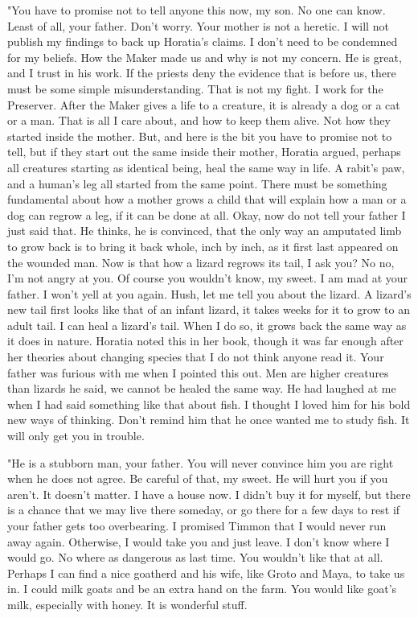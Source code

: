 \documentclass{article}
\begin{document}
"You have to promise not to tell anyone this now, my son. No one can know. Least of all, your father. Don't worry. Your mother is not a heretic. I will not publish my findings to back up Horatia's claims. I don't need to be condemned for my beliefs. How the Maker made us and why is not my concern. He is great, and I trust in his work. If the priests deny the evidence that is before us, there must be some simple misunderstanding. That is not my fight. I work for the Preserver. After the Maker gives a life to a creature, it is already a dog or a cat or a man. That is all I care about, and how to keep them alive. Not how they started inside the mother. But, and here is the bit you have to promise not to tell, but if they start out the same inside their mother, Horatia argued,  perhaps all creatures starting as identical being, heal the same way in life. A rabit's paw, and a human's leg all started from the same point. There must be something fundamental about how a mother grows a child that will explain how a man or a dog can regrow a leg, if it can be done at all. Okay, now do not tell your father I just said that. He thinks, he is convinced, that the only way an amputated limb to grow back is to bring it back whole, inch by inch, as it first last appeared on the wounded man. Now is that how a lizard regrows its tail, I ask you? No no, I'm not angry at you. Of course you wouldn't know, my sweet. I am mad at your father. I won't yell at you again. Hush, let me tell you about the lizard. A lizard's new tail first looks like that of an infant lizard, it takes weeks for it to grow to an adult tail. I can heal a lizard's tail. When I do so, it grows back the same way as it does in nature. Horatia noted this in her book, though it was far enough after her theories about changing species that I do not think anyone read it. Your father was furious with me when I pointed this out. Men are higher creatures than lizards he said, we cannot be healed the same way. He had laughed at me when I had said something like that about fish. I thought I loved him for his bold new ways of thinking. Don't remind him that he once wanted me to study fish. It will only get you in trouble. 

"He is a stubborn man, your father. You will never convince him you are right when he does not agree. Be careful of that, my sweet. He will hurt you if you aren't. It doesn't matter. I have a house now. I didn't buy it for myself, but there is a chance that we may live there someday, or go there for a few days to rest if your father gets too overbearing. I promised Timmon that I would never run away again. Otherwise, I would take you and just leave. I don't know where I would go. No where as dangerous as last time. You wouldn't like that at all. Perhaps I can find a nice goatherd and his wife, like Groto and Maya, to take us in. I could milk goats and be an extra hand on the farm. You would like goat's milk, especially with honey. It is wonderful stuff. 
\end{document}
